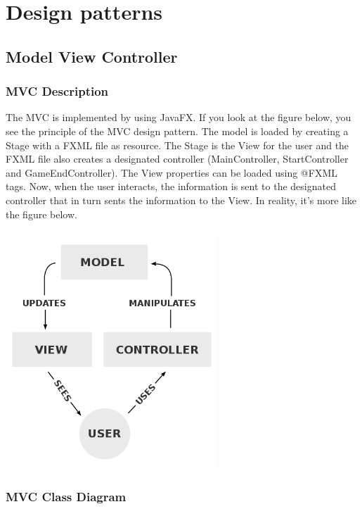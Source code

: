 \chapter{Design patterns}

\section{Model View Controller}

\subsection{MVC Description}
The MVC is implemented by using JavaFX. If you look at the figure below, you see the principle of the MVC design pattern. The model is loaded by creating a Stage with a FXML file as resource. The Stage is the View for the user and the FXML file also creates a designated controller (MainController, StartController and GameEndController). The View properties can be loaded using @FXML tags. Now, when the user interacts, the information is sent to the designated controller that in turn sents the information to the View. In reality, it's more like the figure below.
\\\\
\includegraphics[width=80mm]{MVC.png}

\subsection{MVC Class Diagram}

